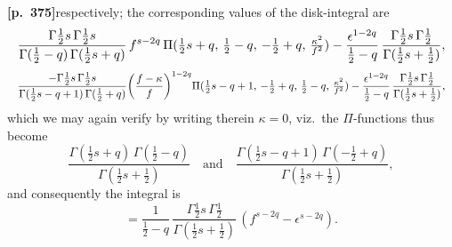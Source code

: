 \documentclass[11pt]{article}
\begin{document}
\bigskip

\noindent\textbf{[p.~375]}\quad respectively; the corresponding values of the disk-integral are
\[
\resizebox{\textwidth}{!}{$\displaystyle
\frac{\Gamma\tfrac{1}{2}s\,\Gamma\tfrac{1}{2}s}{\Gamma(\tfrac{1}{2}-q)\,\Gamma(\tfrac{1}{2}s+q)}\,f^{s-2q}\,\Pi(\tfrac{1}{2}s+q,\,\tfrac{1}{2}-q,\,-\tfrac{1}{2}+q,\,\tfrac{\kappa^{2}}{f^{2}}) - \frac{\epsilon^{1-2q}}{\tfrac{1}{2}-q}\,\frac{\Gamma\tfrac{1}{2}s\,\Gamma\tfrac{1}{2}}{\Gamma(\tfrac{1}{2}s+\tfrac{1}{2})},$}
\]
\[
\resizebox{\textwidth}{!}{$\displaystyle
\frac{-\Gamma\tfrac{1}{2}s\,\Gamma\tfrac{1}{2}s}{\Gamma(\tfrac{1}{2}s-q+1)\,\Gamma(\tfrac{1}{2}+q)}\!\left(\frac{f-\kappa}{f}\right)^{1-2q}\!\Pi(\tfrac{1}{2}s-q+1,\,-\tfrac{1}{2}+q,\,\tfrac{1}{2}-q,\,\tfrac{\kappa^{2}}{f^{2}}) - \frac{\epsilon^{1-2q}}{\tfrac{1}{2}-q}\,\frac{\Gamma\tfrac{1}{2}s\,\Gamma\tfrac{1}{2}}{\Gamma(\tfrac{1}{2}s+\tfrac{1}{2})},$}
\]
which we may again verify by writing therein $\kappa=0$, viz.\ the $\Pi$-functions thus become
\[
\frac{\Gamma(\tfrac{1}{2}s+q)\,\Gamma(\tfrac{1}{2}-q)}{\Gamma(\tfrac{1}{2}s+\tfrac{1}{2})} \quad\text{and}\quad \frac{\Gamma(\tfrac{1}{2}s-q+1)\,\Gamma(-\tfrac{1}{2}+q)}{\Gamma(\tfrac{1}{2}s+\tfrac{1}{2})},
\]
and consequently the integral is
\[
= \frac{1}{\tfrac{1}{2}-q}\,\frac{\Gamma\tfrac{1}{2}s\,\Gamma\tfrac{1}{2}}{\Gamma(\tfrac{1}{2}s+\tfrac{1}{2})}\,(f^{s-2q}-\epsilon^{s-2q}).
\]

\bigskip
\end{document}
